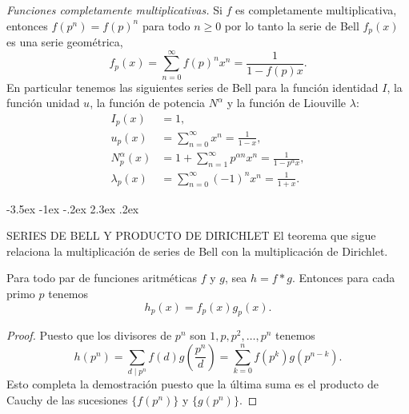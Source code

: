 \documentclass[12pt,a4paper]{book}
\makeatletter
\renewcommand\section{\@startsection{section}{1}{\z@}%
  {-3.5ex \@plus -1ex \@minus -.2ex}%
  {2.3ex \@plus .2ex}%
  {\normalfont\Large\bfseries\raggedright}}
\makeatother
\begin{document}
    \begin{ejemplo}
        \textit{Funciones completamente multiplicativas.} Si $f$ es completamente
        multiplicativa, entonces $f(p^{n})=f(p)^{n}$ para todo $n\geq0$ por lo tanto la serie
        de Bell $f_{p}(x)$ es una serie geométrica,
        \begin{equation*}
            f_{p}(x)=\sum_{n=0}^{\infty}f(p)^{n}x^{n}=\frac{1}{1-f(p)x}.
        \end{equation*}
        En particular tenemos las siguientes series de Bell para la función identidad $I$,
        la función unidad $u$, la función de potencia $N^{\alpha}$ y la función de Liouville
        $\lambda$:
        \begin{align*}
            I_{p}(x)&=1,\\
            u_{p}(x)&=\sum_{n=0}^{\infty}x^{n}=\frac{1}{1-x},\\
            N^{\alpha}_{p}(x)&=1+\sum_{n=1}^{\infty}p^{\alpha n}x^{n}=\frac{1}{1-p^{\alpha} x},\\
            \lambda_{p}(x)&=\sum_{n=0}^{\infty}(-1)^{n}x^{n}=\frac{1}{1+x}.
        \end{align*}
    \end{ejemplo}

    \section{SERIES DE BELL Y PRODUCTO DE DIRICHLET}
    El teorema que sigue relaciona la multiplicación de series de Bell con la
    multiplicación de Dirichlet.

    \begin{teorema}
        Para todo par de funciones aritméticas $f$ y $g$, sea $h=f*g$. Entonces para cada
        primo $p$ tenemos
        \begin{equation*}
            h_{p}(x)=f_{p}(x)g_{p}(x).
        \end{equation*}
    \end{teorema}

    \begin{proof}
        Puesto que los divisores de $p^{n}$ son $1,p,p^{2},\dots,p^{n}$ tenemos
        \begin{equation*}
            h(p^{n})=\sum_{d\mid p^{n}}f(d)g\left(\frac{p^{n}}{d}\right)=\sum_{k=0}^{n}f(p^{k})g(p^{n-k}).
        \end{equation*}
        Esto completa la demostración puesto que la última suma es el producto de Cauchy
        de las sucesiones $\{f(p^{n})\}$ y $\{g(p^{n})\}$.
    \end{proof}
\end{document}
